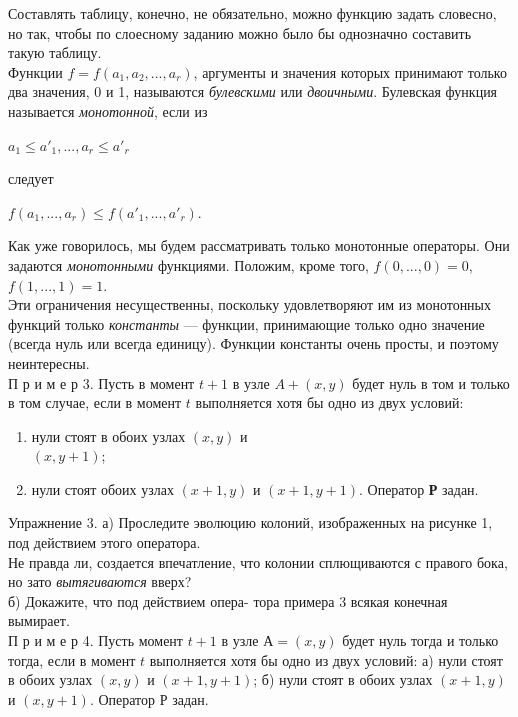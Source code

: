 \documentclass[a4paper]{article}
\begin{document}
\begin{multicols}{2}
\begin{minipage}{\linewidth}
		\end{minipage}
		Составлять таблицу, конечно, не обязательно, можно функцию задать словесно, но так, чтобы по слоесному заданию можно было бы однозначно составить такую таблицу.\\
		Функции $f = f(a_1, a_2,..., a_r)$, аргументы и значения которых принимают только два значения, 0 и 1, называются \textit{булевскими} или \textit{двоичными}. Булевская функция называется \textit{монотонной}, если из 
		\begin{center}
			$ a_1 \leq a'_1, ..., a_r \leq a'_r$
		\end{center}
		следует 
		\begin{center}
			$ f(a_1, ..., a_r) \leq f(a'_1, ..., a'_r)$.
		\end{center}
		Как уже говорилось, мы будем рассматривать только монотонные операторы. Они задаются \textit{монотонными} функциями. Положим, кроме того, $f(0,..., 0) = 0$, $f (1,..., 1) = 1$.\\
		\small{Эти ограничения несущественны, поскольку удовлетворяют им из монотонных функций только \textit{константы} — функции, принимающие только одно значение (всегда нуль или всегда единицу). Функции константы очень просты, и поэтому неинтересны.}\\
		П р и м е р 3. Пусть в момент $t + 1$ в узле $A + (x, y)$ будет нуль в том и только в том случае, если в момент $t$ выполняется хотя бы одно из двух условий:
		\begin{enumerate}
			\item нули стоят в обоих узлах $(x, y)$ и\\ $(x, y + 1)$;
			\item нули стоят обоих узлах $(x + 1, y)$ и $(x + 1, y + 1)$. Оператор \textbf{Р} задан.
		\end{enumerate}
		\small{Упражнение 3. а) Проследите эволюцию колоний, изображенных на рисунке 1, под действием этого оператора.}\\
		\small{Не правда ли, создается впечатление, что колонии сплющиваются с правого бока, но зато \textit{вытягиваются} вверх?}\\
		\small{б) Докажите, что под действием опера- тора примера 3 всякая конечная вымирает.}\\
		П р и м е р 4. Пусть момент $t+1$ в узле $А = (x, y)$ будет нуль тогда и только тогда, если в момент $t$ выполняется хотя бы одно из двух условий:
		а) нули стоят в обоих узлах $(x, y)$ и $(x + 1, y + 1)$;
		б) нули стоят в обоих узлах $(x + 1, y)$ и $(x, y + 1)$. Оператор Р задан.
	\end{multicols}
	
\end{document}
